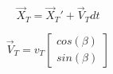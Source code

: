 \documentclass[conference]{IEEEtran}
\begin{document}
\begin{equation}\label{eq:targPos}
\overrightarrow{X}_T = \overrightarrow{X}_T' + \overrightarrow{V}_Tdt
\end{equation}

\begin{equation}\label{eq:targVel}
\overrightarrow{V}_{T} =  v_{T} \begin{bmatrix} cos(\beta) \\ sin(\beta) \end{bmatrix}
\end{equation}


%
%
%




\end{document}
